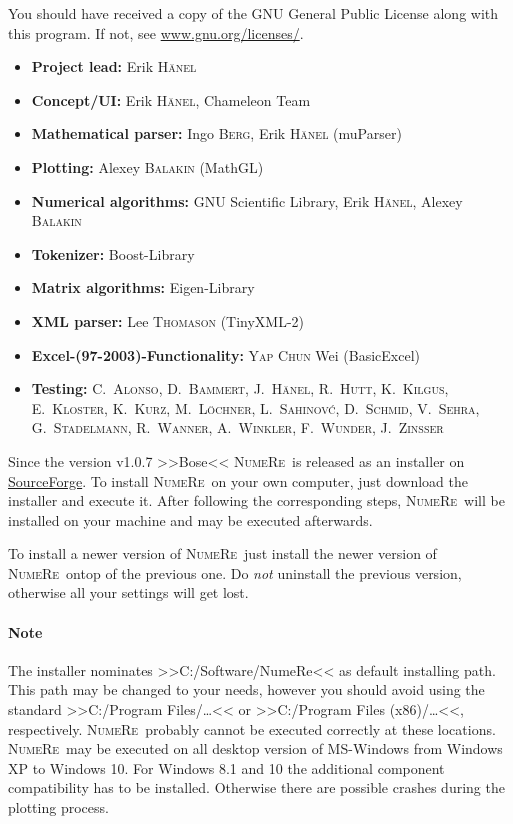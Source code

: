 \documentclass[DIV=14,headsepline,footsepline]{scrbook}
\newcommand{\NR}{\textsc{Nu\-me\-Re}}
\begin{document}
			You should have received a copy of the GNU General Public License along with this program. If not, see \href{http://www.gnu.org/licenses/}{www.gnu.org/licenses/}.
			\begin{itemize}
				\item \textbf{Project lead:} Erik \textsc{Hänel}
				\item \textbf{Concept/UI:} Erik \textsc{Hänel}, Chameleon Team
				\item \textbf{Mathematical parser:} Ingo \textsc{Berg}, Erik \textsc{Hänel} (muParser)
				\item \textbf{Plotting:} Alexey \textsc{Balakin} (MathGL)
				\item \textbf{Numerical algorithms:} GNU Scientific Library, Erik \textsc{Hänel}, Alexey \textsc{Balakin}
				\item \textbf{Tokenizer:} Boost-Library
				\item \textbf{Matrix algorithms:} Eigen-Library
				\item \textbf{XML parser:} Lee \textsc{Thomason} (TinyXML-2)
				\item \textbf{Excel-(97-2003)-Functionality:} \textsc{Yap Chun} Wei (BasicExcel)
				\item \textbf{Testing:} C.~\textsc{Alonso}, D.~\textsc{Bammert}, J.~\textsc{Hänel}, R.~\textsc{Hutt}, K.~\textsc{Kilgus}, E.~\textsc{Kloster}, K.~\textsc{Kurz}, M.~\textsc{Löchner}, L.~\textsc{Sahinov\'c}, D.~\textsc{Schmid}, V.~\textsc{Sehra}, G.~\textsc{Stadelmann}, R.~\textsc{Wanner}, A.~\textsc{Winkler}, F.~\textsc{Wunder}, J.~\textsc{Zinßer}
			\end{itemize}
		Since the version v1.0.7 >>Bose<< \NR\ is released as an installer on \href{https://sourceforge.net/projects/numere/files/latest/download}{SourceForge}. To install \NR\ on your own computer, just download the installer and execute it. After following the corresponding steps, \NR\ will be installed on your machine and may be executed afterwards.
		
		To install a newer version of \NR\ just install the newer version of \NR\ ontop of the previous one. Do \emph{not} uninstall the previous version, otherwise all your settings will get lost.
		\paragraph{Note}
			The installer nominates >>C:/Software/NumeRe<< as default installing path. This path may be changed to your needs, however you should avoid using the standard >>C:/Program Files/\ldots<< or >>C:/Program Files (x86)/\ldots<<, respectively. \NR\ probably cannot be executed correctly at these locations.
			\NR\ may be executed on all desktop version of MS-Windows from Windows XP to Windows 10. For Windows 8.1 and 10 the additional component compatibility has to be installed. Otherwise there are possible crashes during the plotting process.
			
\end{document}
